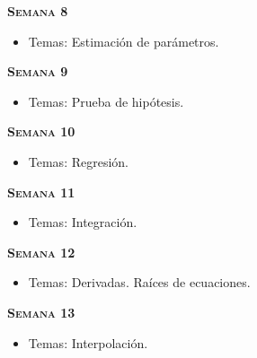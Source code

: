 \documentclass[letterpaper,10pt,onecolumn]{article}
\begin{document}
\noindent\textbf{\textsc{Semana 8}}\\[-0.5cm]
\begin{itemize}
\item Temas: Estimaci\'on de par\'ametros.
\\[-0.6cm] 
\end{itemize}

\noindent\textbf{\textsc{Semana 9}}\\[-0.5cm]
\begin{itemize}
\item Temas: Prueba de hip\'otesis.\\[-0.6cm]   
\end{itemize}


\noindent\textbf{\textsc{Semana 10}}\\[-0.5cm]
\begin{itemize}
\item Temas: Regresi\'on.\\[-0.6cm]
\end{itemize}

\noindent\textbf{\textsc{Semana 11}}\\[-0.5cm]
\begin{itemize}
\item Temas: Integraci\'on. \\[-0.6cm]
\end{itemize}

\noindent\textbf{\textsc{Semana 12}}\\[-0.5cm]
\begin{itemize}
\item Temas: Derivadas. Ra\'ices de ecuaciones. \\[-0.6cm]
\end{itemize}

\noindent\textbf{\textsc{Semana 13}}\\[-0.5cm]
\begin{itemize}
\item Temas: Interpolación. \\[-0.6cm]
\end{itemize}
\end{document}
